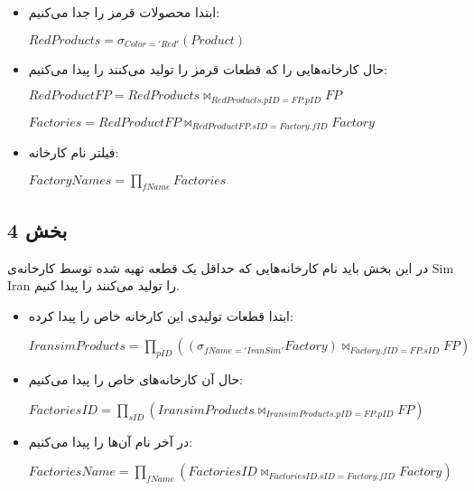 \begin{itemize}	
	\item ابتدا محصولات قرمز را جدا می‌کنیم:
	
	\setLTR
	$RedProducts = \sigma_{Color='Red'}(Product) $
	\setRTL
	
	
	\item حال کارخانه‌هایی را که قطعات قرمز را تولید می‌کنند را پیدا می‌کنیم:
	
	\setLTR
	$RedProductFP = RedProducts\bowtie_{RedProducts.pID=FP.pID}FP$
	
	$Factories = RedProductFP\bowtie_{RedProductFP.sID=Factory.fID}Factory$
	\setRTL
	
		\item فیلتر نام کارخانه:
	
	\setLTR
	$FactoryNames = \prod_{fName}Factories$

	\setRTL
\end{itemize}
\pagebreak
\subsection*{بخش 4}
در این بخش باید نام کارخانه‌هایی که حداقل یک قطعه تهیه شده توسط کارخانه‌ی Sim Iran را تولید می‌کنند را پیدا کنیم.

\begin{itemize}	
	\item ابتدا قطعات تولیدی این کارخانه خاص را پیدا کرده:
	
	\setLTR
	$IransimProducts = \prod_{pID} {({(\sigma_{fName='Iran Sim'}Factory)}\bowtie_{Factory.fID=FP.sID}FP)} $
	\setRTL
	
		\item حال آن کارخانه‌های خاص را پیدا می‌کنیم:
	
	\setLTR
	$FactoriesID =\prod_{sID}{(IransimProducts \bowtie_{IransimProducts.pID=FP.pID}FP)}  $
	\setRTL
	
			\item در آخر نام آن‌ها را پیدا می‌کنیم:
	
	\setLTR
	$FactoriesName =\prod_{fName}{(FactoriesID \bowtie_{FactoriesID.sID=Factory.fID}Factory)}  $
	\setRTL
	
	
\end{itemize}
